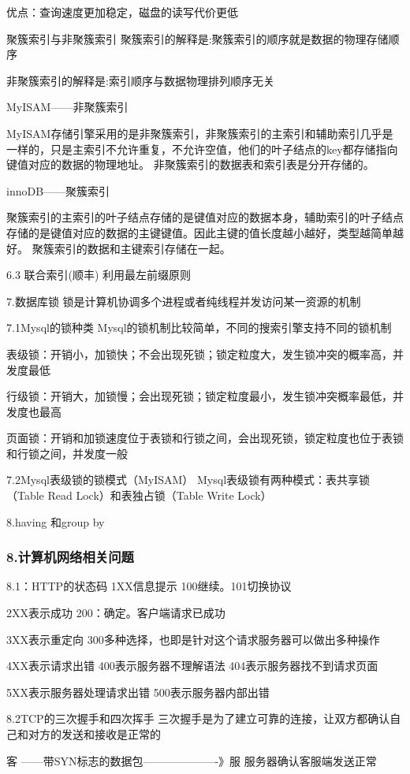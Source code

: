 \documentclass[UTF8]{ctexart}
\begin{document}
优点：查询速度更加稳定，磁盘的读写代价更低

聚簇索引与非聚簇索引
聚簇索引的解释是:聚簇索引的顺序就是数据的物理存储顺序

非聚簇索引的解释是:索引顺序与数据物理排列顺序无关

MyISAM——非聚簇索引

MyISAM存储引擎采用的是非聚簇索引，非聚簇索引的主索引和辅助索引几乎是一样的，只是主索引不允许重复，不允许空值，他们的叶子结点的key都存储指向键值对应的数据的物理地址。
非聚簇索引的数据表和索引表是分开存储的。

innoDB——聚簇索引

聚簇索引的主索引的叶子结点存储的是键值对应的数据本身，辅助索引的叶子结点存储的是键值对应的数据的主键键值。因此主键的值长度越小越好，类型越简单越好。
聚簇索引的数据和主键索引存储在一起。

6.3 联合索引(顺丰)
利用最左前缀原则

7.数据库锁
锁是计算机协调多个进程或者纯线程并发访问某一资源的机制

7.1Mysql的锁种类
Mysql的锁机制比较简单，不同的搜索引擎支持不同的锁机制

表级锁：开销小，加锁快；不会出现死锁；锁定粒度大，发生锁冲突的概率高，并发度最低

行级锁：开销大，加锁慢；会出现死锁；锁定粒度最小，发生锁冲突概率最低，并发度也最高

页面锁：开销和加锁速度位于表锁和行锁之间，会出现死锁，锁定粒度也位于表锁和行锁之间，并发度一般

7.2Mysql表级锁的锁模式（MyISAM）
Mysql表级锁有两种模式：表共享锁（Table Read Lock）和表独占锁（Table Write Lock）

8.having 和group by
\subsubsection{8.计算机网络相关问题}
8.1：HTTP的状态码
1XX信息提示 100继续。101切换协议

2XX表示成功 200：确定。客户端请求已成功

3XX表示重定向 300多种选择，也即是针对这个请求服务器可以做出多种操作

4XX表示请求出错 400表示服务器不理解语法 404表示服务器找不到请求页面

5XX表示服务器处理请求出错 500表示服务器内部出错

8.2TCP的三次握手和四次挥手
三次握手是为了建立可靠的连接，让双方都确认自己和对方的发送和接收是正常的

客 ---—带SYN标志的数据包—--------———-》服 服务器确认客服端发送正常
\end{document}
